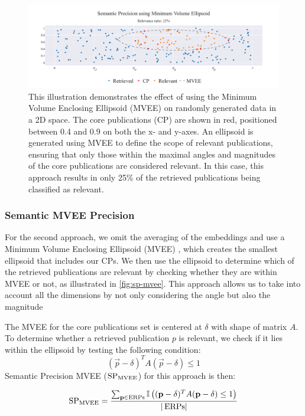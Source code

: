 \begin{figure}[h!]
	\hspace*{-1cm}	
	\includegraphics[scale=0.48]{pics/sp_mvee.pdf}
	\caption[Semantic Precision using MVEEE]{This illustration demonstrates the effect of using the Minimum Volume Enclosing Ellipsoid (MVEE) on randomly generated data in a 2D space. The core publications (CP) are shown in red, positioned between 0.4 and 0.9 on both the x- and y-axes. An ellipsoid is generated using MVEE to define the scope of relevant publications, ensuring that only those within the maximal angles and magnitudes of the core publications are considered relevant. In this case, this approach results in only 25\% of the retrieved publications being classified as relevant.}

	\label{fig:sp-mvee}
\end{figure}

\subsubsection{Semantic MVEE Precision}
For the second approach, we omit the averaging of the embeddings and use a Minimum Volume Enclosing Ellipsoid (MVEE) \autocite{Todd2007}, which creates the smallest ellipsoid that includes our CPs. We then use the ellipsoid to determine which of the retrieved publications are relevant by checking whether they are within MVEE or not, as illustrated in \autoref{fig:sp-mvee}. This approach allows us to take into account all the dimensions by not only considering the angle but also the magnitude

The MVEE for the core publications set is centered at $\delta$ with shape of matrix $A$. To determine whether a retrieved publication $p$ is relevant, we check if it lies within the ellipsoid by testing the following condition:
\[
(\vec{p} - \delta)^T A (\vec{p} - \delta) \leq 1
\]
Semantic Precision MVEE ($\mathop{}\!\mathrm{SP}_\text{{MVEE}}$) for this approach is then:

\begin{equation}\label{eq:sp-mvee}
	\mathop{}\!\mathrm{SP}_{\text{MVEE}} = \frac{\sum_{\mathbf{p} \in \mathop{}\!\mathrm{ERPs}} \mathbb{I} \left( (\mathbf{p} - \delta)^T A (\mathbf{p} - \delta) \leq 1 \right)}{|\mathop{}\!\mathrm{ERPs}|}
\end{equation}

